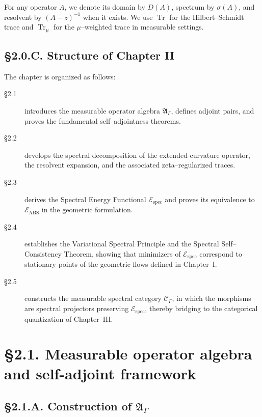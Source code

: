 For any operator $A$, we denote its domain by $D(A)$, spectrum by $\sigma(A)$, and resolvent by $(A-z)^{-1}$ when it exists.  
We use $\operatorname{Tr}$ for the Hilbert–Schmidt trace and $\operatorname{Tr}_\mu$ for the $\mu$–weighted trace in measurable settings.

\subsection*{§2.0.C. Structure of Chapter II}

The chapter is organized as follows:

\begin{description}
  \item[§2.1] introduces the measurable operator algebra $\mathfrak{A}_\Gamma$, defines adjoint pairs, and proves the fundamental self–adjointness theorems.
  \item[§2.2] develops the spectral decomposition of the extended curvature operator, the resolvent expansion, and the associated zeta–regularized traces.
  \item[§2.3] derives the Spectral Energy Functional $\mathcal{E}_{\mathrm{spec}}$ and proves its equivalence to $\mathcal{E}_{\mathrm{ABS}}$ in the geometric formulation.
  \item[§2.4] establishes the Variational Spectral Principle and the Spectral Self–Consistency Theorem, showing that minimizers of $\mathcal{E}_{\mathrm{spec}}$ correspond to stationary points of the geometric flows defined in Chapter~I.
  \item[§2.5] constructs the measurable spectral category $\mathcal{C}_\Gamma$, in which the morphisms are spectral projectors preserving $\mathcal{E}_{\mathrm{spec}}$, thereby bridging to the categorical quantization of Chapter~III.
\end{description}


\section{§2.1. Measurable operator algebra and self-adjoint framework}

\subsection*{§2.1.A. Construction of $\mathfrak{A}_\Gamma$}

